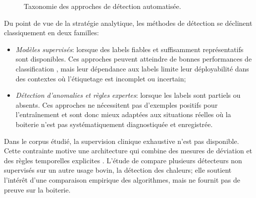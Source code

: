 \begin{figure}[H]
{%
    }
    \caption{Taxonomie des approches de détection automatisée.}
    \label{fig:taxonomie_approches}
\end{figure}

Du point de vue de la stratégie analytique, les méthodes de détection se déclinent
classiquement en deux familles:
\begin{itemize}
    \item[(a)] \textit{Modèles supervisés}: lorsque des labels fiables et suffisamment
    représentatifs sont disponibles. Ces approches peuvent atteindre de bonnes performances
    de classification
    \citep{vanhertem2014evaluation,viazzi2013analysis}, mais leur
    dépendance aux labels limite leur déployabilité dans des contextes où l'étiquetage est
    incomplet ou incertain;
    \item[(b)] \textit{Détection d'anomalies et règles expertes}: lorsque les labels sont
    partiels ou absents. Ces approches ne nécessitent pas d'exemples positifs pour
    l'entraînement et sont donc mieux adaptées aux situations réelles où la boiterie n'est
    pas systématiquement diagnostiquée et enregistrée.
\end{itemize}

Dans le corpus étudié, la supervision clinique exhaustive n'est pas disponible. Cette
contrainte motive une architecture qui combine des mesures de déviation et des règles
temporelles explicites \citep{chandola2009anomaly,palma2025scoping}. L'étude de
\citet{michelena2025comparative} compare plusieurs détecteurs non supervisés sur un autre
usage bovin, la détection des chaleurs; elle soutient l'intérêt d'une comparaison empirique
des algorithmes, mais ne fournit pas de preuve sur la boiterie.

